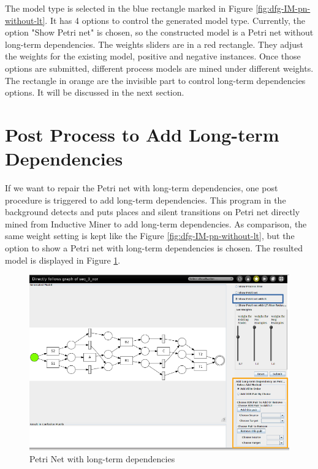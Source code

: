 The model type is selected in the blue rectangle marked in Figure \ref{fig:dfg-IM-pn-without-lt}. It has 4 options to control the generated model type. Currently, the option "Show Petri net" is chosen, so the constructed model is a Petri net without long-term dependencies. The weights sliders are in a red rectangle. They adjust the weights for the existing model, positive and negative instances. Once those options are submitted, different process models are mined under different weights. The rectangle in orange are the invisible part to control long-term dependencies options. It will be discussed in the next section.

\section{Post Process to Add Long-term Dependencies }
If we want to repair the Petri net with long-term dependencies, one post procedure is triggered to add long-term dependencies. This program in the background detects and puts places and silent transitions on Petri net directly mined from Inductive Miner to add long-term dependencies. As comparison, the same weight setting is kept like the Figure \ref{fig:dfg-IM-pn-without-lt}, but the option to show a Petri net with long-term dependencies is chosen. The resulted model is displayed in  Figure \ref{fig:dfg-IM-pn-with-lt}. 
\begin{figure}
	\centering
	\includegraphics[width=\textwidth]{figures/implementation/dfg-IM-pn-with-lt.png}
	\caption{Petri Net with long-term dependencies }
	\label{fig:dfg-IM-pn-with-lt}
\end{figure}

